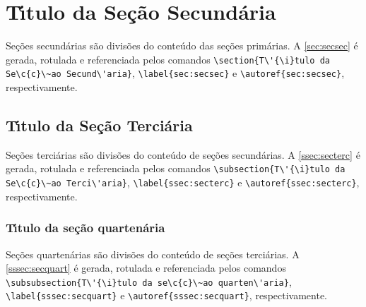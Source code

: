 \section{T\'{\i}tulo da Se\c{c}\~ao Secund\'aria}\label{sec:secsec}

Se\c{c}\~oes secund\'arias s\~ao divis\~oes do conte\'udo das se\c{c}\~oes prim\'arias. A \autoref{sec:secsec} \'e gerada, rotulada e referenciada pelos comandos \verb|\section{T\'{\i}tulo da Se\c{c}\~ao Secund\'aria}|, \verb|\label{sec:secsec}| e \verb|\autoref{sec:secsec}|, respectivamente.

\subsection{T\'{\i}tulo da Se\c{c}\~ao Terci\'aria}\label{ssec:secterc}

Se\c{c}\~oes terci\'arias s\~ao divis\~oes do conte\'udo de se\c{c}\~oes secund\'arias. A \autoref{ssec:secterc} \'e gerada, rotulada e referenciada pelos comandos \verb|\subsection{T\'{\i}tulo da Se\c{c}\~ao Terci\'aria}|, \verb|\label{ssec:secterc}| e \verb|\autoref{ssec:secterc}|, respectivamente.

\subsubsection{T\'{\i}tulo da se\c{c}\~ao quarten\'aria}\label{sssec:secquart}

Se\c{c}\~oes quarten\'arias s\~ao divis\~oes do conte\'udo de se\c{c}\~oes terci\'arias. A \autoref{sssec:secquart} \'e gerada, rotulada e referenciada pelos comandos \verb|\subsubsection{T\'{\i}tulo da se\c{c}\~ao quarten\'aria}|, \verb|\label{sssec:secquart}| e \verb|\autoref{sssec:secquart}|, respectivamente.

